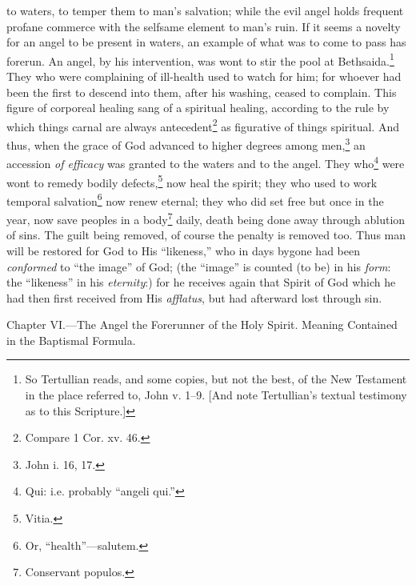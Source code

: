 to waters, to temper them to man’s salvation; while the evil angel holds frequent profane commerce with the selfsame element to man’s ruin. If it seems a novelty for an angel to be present in waters, an example of what was to come to pass has forerun. An angel, by his intervention, was wont to stir the pool at Bethsaida.\footnote{So Tertullian reads, and some copies, but not the best, of the New Testament in the place referred to, John v. 1–9. [And note Tertullian’s textual testimony as to this Scripture.]} They who were complaining of ill-health used to watch for him; for whoever had been the first to descend into them, after his washing, ceased to complain. This figure of corporeal healing sang of a spiritual healing, according to the rule by which things carnal are always antecedent\footnote{Compare 1 Cor. xv. 46.} as figurative of things spiritual. And thus, when the grace of God advanced to higher degrees among men,\footnote{John i. 16, 17.} an accession \emph{of efficacy} was granted to the waters and to the angel. They who\footnote{Qui: i.e. probably “angeli qui.”} were wont to remedy bodily defects,\footnote{Vitia.} now heal the spirit; they who used to work temporal salvation\footnote{Or, “health”—salutem.} now renew eternal; they who did set free but once in the year, now save peoples in a body\footnote{Conservant populos.} daily, death being done away through ablution of sins. The guilt being removed, of course the penalty is removed too. Thus man will be restored for God to His “likeness,” who in days bygone had been \emph{conformed} to “the image” of God; (the “image” is counted (to be) in his \emph{form}: the “likeness” in his \emph{eternity}:) for he receives again that Spirit of God which he had then first received from His \emph{afflatus}, but had afterward lost through sin.


Chapter VI.—The Angel the Forerunner of the Holy Spirit. Meaning Contained in the Baptismal Formula.

